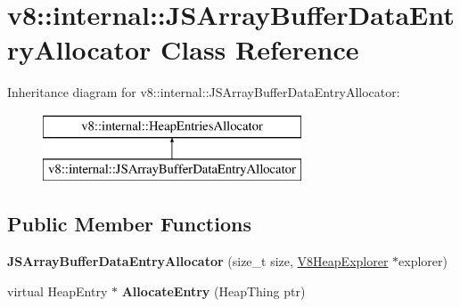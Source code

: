 \hypertarget{classv8_1_1internal_1_1_j_s_array_buffer_data_entry_allocator}{}\section{v8\+:\+:internal\+:\+:J\+S\+Array\+Buffer\+Data\+Entry\+Allocator Class Reference}
\label{classv8_1_1internal_1_1_j_s_array_buffer_data_entry_allocator}
Inheritance diagram for v8\+:\+:internal\+:\+:J\+S\+Array\+Buffer\+Data\+Entry\+Allocator\+:\begin{figure}[H]
\begin{center}
\leavevmode
\includegraphics[height=2.000000cm]{classv8_1_1internal_1_1_j_s_array_buffer_data_entry_allocator}
\end{center}
\end{figure}
\subsection*{Public Member Functions}
\begin{DoxyCompactItemize}
\item 
{\bfseries J\+S\+Array\+Buffer\+Data\+Entry\+Allocator} (size\+\_\+t size, \hyperlink{classv8_1_1internal_1_1_v8_heap_explorer}{V8\+Heap\+Explorer} $\ast$explorer)\hypertarget{classv8_1_1internal_1_1_j_s_array_buffer_data_entry_allocator_a218f662ce481752a0a3f6593f570341a}{}\label{classv8_1_1internal_1_1_j_s_array_buffer_data_entry_allocator_a218f662ce481752a0a3f6593f570341a}

\item 
virtual Heap\+Entry $\ast$ {\bfseries Allocate\+Entry} (Heap\+Thing ptr)\hypertarget{classv8_1_1internal_1_1_j_s_array_buffer_data_entry_allocator_a9b8ac3c7d864ad7b32a2ae58ba97fdbb}{}\label{classv8_1_1internal_1_1_j_s_array_buffer_data_entry_allocator_a9b8ac3c7d864ad7b32a2ae58ba97fdbb}

\end{DoxyCompactItemize}
